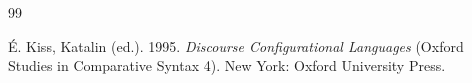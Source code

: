 \documentclass[a4paper, ruler]{CUP-JNL-LIN}%
\begin{document}
\begin{Backmatter}
\begin{thebibliography}{99}

{É. Kiss, Katalin} (ed.). 1995. \textit{Discourse Configurational Languages} (Oxford Studies in Comparative Syntax 4). New York: Oxford University Press.




\end{thebibliography}
\end{Backmatter}
\end{document}

